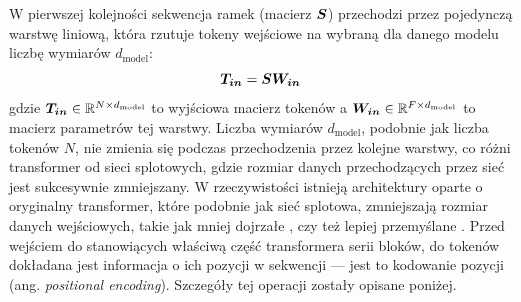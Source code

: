 W pierwszej kolejności sekwencja ramek (macierz $\boldsymbol{S}$) przechodzi przez pojedynczą warstwę liniową, która rzutuje tokeny wejściowe na wybraną dla danego modelu liczbę wymiarów $d_{\mathrm{model}}$:
\begin{equation}
    \boldsymbol{T_{in}} = \boldsymbol{S} \boldsymbol{W_{in}}
\end{equation}
gdzie $\boldsymbol{T_{in}} \in \mathbb{R}^{N \times d_{\mathrm{model}}}$ to wyjściowa macierz tokenów a $\boldsymbol{W_{in}} \in \mathbb{R}^{F \times d_{\mathrm{model}}}$ to macierz parametrów tej warstwy. Liczba wymiarów $d_{\mathrm{model}}$, podobnie jak liczba tokenów $N$, nie zmienia się podczas przechodzenia przez kolejne warstwy, co różni transformer od sieci splotowych, gdzie rozmiar danych przechodzących przez sieć jest sukcesywnie zmniejszany. W rzeczywistości istnieją architektury oparte o oryginalny transformer, które podobnie jak sieć splotowa, zmniejszają rozmiar danych wejściowych, takie jak mniej dojrzałe \cite{liu_swin_2021}, czy też lepiej przemyślane \cite{dai_coatnet_2021}. Przed wejściem do stanowiących właściwą część transformera serii bloków, do tokenów dokładana jest informacja o ich pozycji w sekwencji --- jest to kodowanie pozycji (ang. \emph{positional encoding}). Szczegóły tej operacji zostały opisane poniżej.

